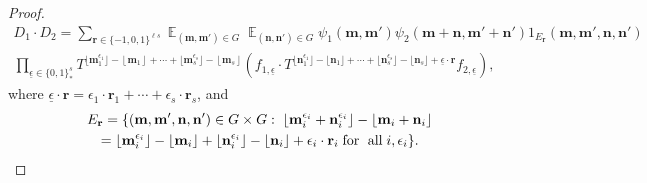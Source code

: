 \documentclass[11pt]{amsart}
\theoremstyle{definition}
\DeclareMathOperator*{\E}{\mathbb{E}}
\newcommand{\Z}{{\mathbb Z}}
\newcommand{\bm}{{\mathbf{m}}}
\newcommand{\bn}{{\mathbf{n}}}
\newcommand{\br}{{\mathbf{r}}}
\newcommand{\eps}{\epsilon}
\newcommand{\ueps}{{\underline{\epsilon}}}
\newcommand{\1}{{\mathbf{1}}}
\newcommand{\floor}[1]{{\left \lfloor #1 \right \rfloor}}
\newcommand{\sfloor}[1]{{\lfloor #1 \rfloor}}
\begin{document}
\begin{proof}
\begin{multline*}
        D_1\cdot D_2 = \sum_{\br\in \{-1,0,1\}^{\ell s}}\E_{(\bm, \bm')\in G}  \E_{(\bn, \bn')\in G} \psi_1(\bm,\bm')\psi_2(\bm+\bn, \bm'+\bn')1_{E_\br}(\bm,\bm',\bn,\bn')\\
        \prod_{\ueps\in\{0,1\}^s_*}T^{\sfloor{\bm_1^{\eps_1}}-\floor{\bm_1}+\cdots + \sfloor{\bm_s^{\eps_s}}-\floor{\bm_s}} (f_{1,\ueps} \cdot T^{\sfloor{\bn_1^{\eps_1}} - \sfloor{\bn_1} + \cdots + \sfloor{\bn_s^{\eps_s}} - \sfloor{\bn_s}+ \ueps\cdot \br}f_{2,\ueps}),
    \end{multline*}
    where %
    $\ueps\cdot \br = \eps_1\cdot \br_1+\cdots + \eps_s\cdot\br_s$, and
    \begin{multline*}
        E_{\br} = \{(\bm,\bm',\bn,\bn')\in G\times G:\; \sfloor{\bm_i^{\eps_i}+\bn_i^{\eps_i}}-\sfloor{\bm_i + \bn_i}\\
        = \sfloor{\bm_i^{\eps_i}}-\sfloor{\bm_i}+\sfloor{\bn_i^{\eps_i}} - \sfloor{\bn_i} + \eps_i\cdot \br_{i}\; \textrm{for\; all}\; i, \eps_i\}.
    \end{multline*}


\end{proof}
\end{document}
